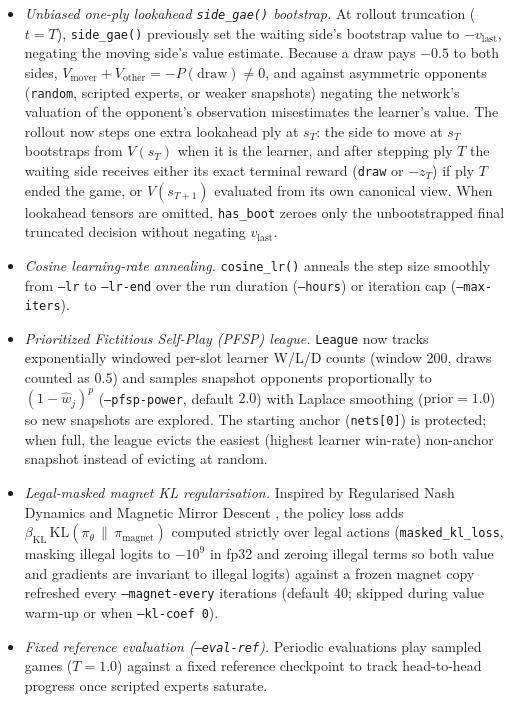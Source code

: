 \begin{itemize}
  \item \emph{Unbiased one-ply lookahead \texttt{side\_gae()} bootstrap.} At rollout truncation
        ($t = T$), \texttt{side\_gae()} previously set the waiting side's bootstrap value to
        $-v_{\text{last}}$, negating the moving side's value estimate. Because a draw pays $-0.5$
        to both sides, $V_{\text{mover}} + V_{\text{other}} = -P(\text{draw}) \neq 0$, and against
        asymmetric opponents (\texttt{random}, scripted experts, or weaker snapshots) negating the
        network's valuation of the opponent's observation misestimates the learner's value. The
        rollout now steps one extra lookahead ply at $s_T$: the side to move at $s_T$ bootstraps
        from $V(s_T)$ when it is the learner, and after stepping ply $T$ the waiting side receives
        either its exact terminal reward (\texttt{draw} or $-z_T$) if ply $T$ ended the game, or
        $V(s_{T+1})$ evaluated from its own canonical view. When lookahead tensors are omitted,
        \texttt{has\_boot} zeroes only the unbootstrapped final truncated decision without negating
        $v_{\text{last}}$.
  \item \emph{Cosine learning-rate annealing.} \texttt{cosine\_lr()} anneals the step size smoothly
        from \texttt{--lr} to \texttt{--lr-end} over the run duration (\texttt{--hours}) or
        iteration cap (\texttt{--max-iters}).
  \item \emph{Prioritized Fictitious Self-Play (PFSP) league.} \texttt{League} now tracks
        exponentially windowed per-slot learner W/L/D counts (window 200, draws counted as $0.5$)
        and samples snapshot opponents proportionally to $(1 - \hat{w}_j)^p$
        (\texttt{--pfsp-power}, default $2.0$) with Laplace smoothing ($\text{prior} = 1.0$) so
        new snapshots are explored. The starting anchor (\texttt{nets[0]}) is protected; when full,
        the league evicts the easiest (highest learner win-rate) non-anchor snapshot instead of
        evicting at random.
  \item \emph{Legal-masked magnet KL regularisation.} Inspired by Regularised Nash Dynamics
        \cite{perolat2022stratego} and Magnetic Mirror Descent \cite{Ataraxos2025}, the policy loss
        adds $\beta_{\text{KL}}\,\mathrm{KL}(\pi_\theta \,\|\, \pi_{\text{magnet}})$ computed
        strictly over legal actions (\texttt{masked\_kl\_loss}, masking illegal logits to $-10^9$
        in fp32 and zeroing illegal terms so both value and gradients are invariant to illegal
        logits) against a frozen magnet copy refreshed every \texttt{--magnet-every} iterations
        (default 40; skipped during value warm-up or when \texttt{--kl-coef 0}).
  \item \emph{Fixed reference evaluation (\texttt{--eval-ref}).} Periodic evaluations play sampled
        games ($T = 1.0$) against a fixed reference checkpoint to track head-to-head progress once
        scripted experts saturate.
\end{itemize}

